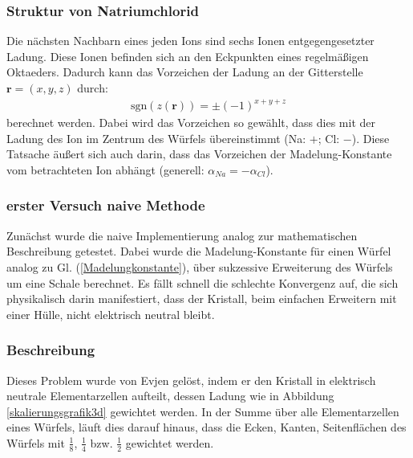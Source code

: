 \documentclass[10pt,a4paper]{article}
\begin{document}
\subsubsection{Struktur von Natriumchlorid}

Die nächsten Nachbarn eines jeden Ions sind sechs Ionen entgegengesetzter
Ladung. Diese Ionen befinden sich an den Eckpunkten eines regelmäßigen
Oktaeders. Dadurch kann das Vorzeichen der Ladung an der Gitterstelle
$\mathbf{r} = \left( x,y,z \right)$ durch:
\begin{align}
\mathrm{sgn}\left(z(\mathbf{r})\right) = \pm \left( -1 \right)^{x+y+z}
\end{align}
berechnet werden. Dabei wird das Vorzeichen so gewählt, dass dies mit der Ladung
des Ion im Zentrum des Würfels übereinstimmt (Na: $+$; Cl: $-$). Diese Tatsache
äußert sich auch darin, dass das Vorzeichen der Madelung-Konstante vom
betrachteten Ion abhängt (generell: $\alpha_{Na} = - \alpha_{Cl}$).
\subsubsection{erster Versuch naive Methode}

Zunächst wurde die naive Implementierung analog zur mathematischen Beschreibung
getestet. Dabei wurde die Madelung-Konstante für einen Würfel analog zu
Gl. (\ref{Madelungkonstante}), über sukzessive Erweiterung des Würfels um eine
Schale berechnet. Es fällt schnell die schlechte Konvergenz auf, die sich
physikalisch darin manifestiert, dass der Kristall, beim einfachen Erweitern
mit einer Hülle, nicht elektrisch neutral bleibt.

\subsubsection{Beschreibung}
Dieses Problem wurde von Evjen \cite{Evjen} gelöst, indem er den Kristall in 
elektrisch neutrale Elementarzellen aufteilt, dessen Ladung wie in Abbildung
\ref{skalierungsgrafik3d} gewichtet werden. In der Summe über alle Elementarzellen
eines Würfels, läuft dies darauf hinaus, dass die Ecken, Kanten, Seitenflächen
des Würfels mit $\frac{1}{8}$, $\frac{1}{4}$ bzw. $\frac{1}{2}$ gewichtet werden.
\end{document}
